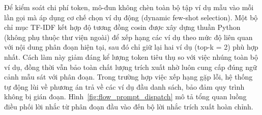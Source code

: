 \indent Để kiểm soát chi phí token, mô-đun không chèn toàn bộ tập ví dụ mẫu vào mỗi lần gọi mà áp dụng cơ chế chọn ví dụ động (dynamic few-shot selection). Một bộ chỉ mục TF-IDF kết hợp độ tương đồng cosin được xây dựng thuần Python (không phụ thuộc thư viện ngoài) để xếp hạng các ví dụ theo mức độ liên quan với nội dung phân đoạn hiện tại, sau đó chỉ giữ lại hai ví dụ (top-k = 2) phù hợp nhất. Cách làm này giảm đáng kể lượng token tiêu thụ so với việc nhúng toàn bộ ví dụ, đồng thời vẫn bảo toàn chất lượng trích xuất nhờ luôn cung cấp đúng ngữ cảnh mẫu sát với phân đoạn. Trong trường hợp việc xếp hạng gặp lỗi, hệ thống tự động lùi về phương án trả về các ví dụ đầu danh sách, bảo đảm quy trình không bị gián đoạn. Hình~\ref{fig:flow_prompt_dispatch} mô tả tổng quan luồng điều phối lời nhắc từ phân đoạn đầu vào đến bộ lời nhắc trích xuất hoàn chỉnh.

